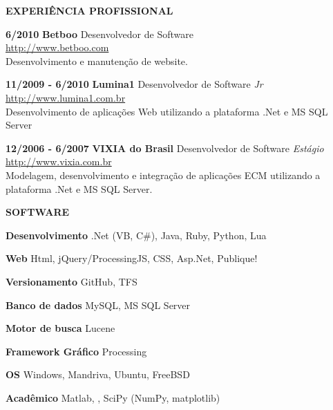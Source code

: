 \documentclass[12pt]{article}
\begin{document}
\hspace{-.29in}
 {\bf  EXPERIÊNCIA PROFISSIONAL }
 \begin{list}{name}{ 18em \leftmargin 1.53in \itemsep -.025in }
\item [\bf 6/2010] {\textbf{Betboo}} Desenvolvedor de Software\\
	\scriptsize \url{http://www.betboo.com} \normalsize\\
	Desenvolvimento e manutenção de website.
\item [\textbf{11/2009 - 6/2010}] {\textbf{Lumina1}} Desenvolvedor de Software \emph{Jr}\\
  \scriptsize \url{http://www.lumina1.com.br} \normalsize\\
	Desenvolvimento de aplicações Web utilizando a plataforma .Net e MS SQL Server  \\
\item [\textbf{12/2006 - 6/2007}] {\textbf{VIXIA do Brasil}} Desenvolvedor de Software \emph{Estágio}\\
  \scriptsize \url{http://www.vixia.com.br} \normalsize\\
	Modelagem, desenvolvimento e integração de aplicações ECM utilizando a plataforma .Net e MS SQL Server.\\
\end{list}

\newpage

\hspace{-.29in}
 {\bf  SOFTWARE }
 \begin{list}{name}{ 18em \leftmargin 1.53in \itemsep -.025in }
\item [\textbf{Desenvolvimento}] {.Net (VB, C\#), Java, Ruby, Python, Lua} 
\item [\textbf{Web}] {Html, jQuery/ProcessingJS, CSS, Asp.Net, Publique!} 
\item [\textbf{Versionamento}] {GitHub, TFS} 
\item [\textbf{Banco de dados}] {MySQL, MS SQL Server} 
\item [\textbf{Motor de busca}] {Lucene} 
\item [\textbf{Framework Gráfico}] {Processing} 
\item [\textbf{OS}] {Windows, Mandriva, Ubuntu, FreeBSD} 
\item [\textbf{Acadêmico}] {Matlab, \LaTeXe, SciPy (NumPy, matplotlib)} 
\end{list}

\vfill
\end{document}
